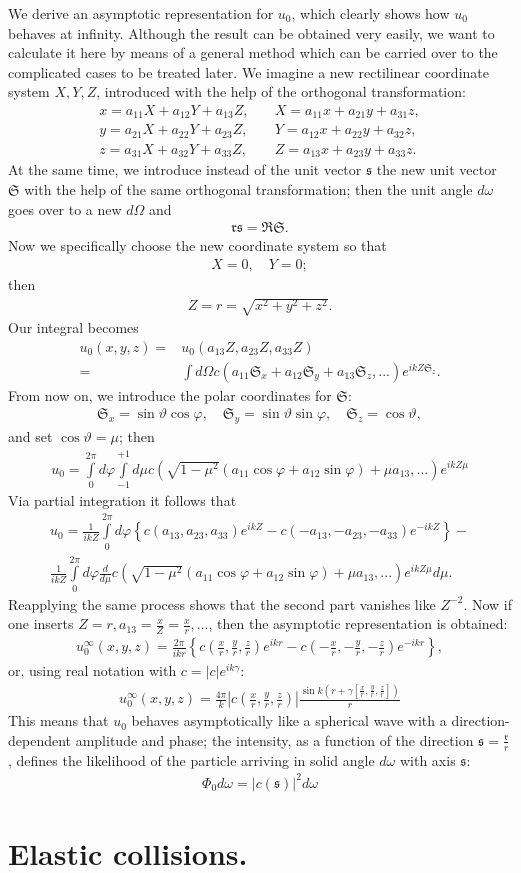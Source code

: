 \documentclass[a4paper,11pt]{article}
\newcommand{\?}[2]{#1\footnote{\textsc{Translator note}: #2}}
\newcommand{\nequ}[2]{\begin{align*}\tag{#1}#2\end{align*}}
\newcommand{\uequ}[1]{\begin{align*}#1\end{align*}}
\renewcommand{\exp}[1]{e^{#1}}
\newcommand{\dXdY}[2]{\frac{d{#1}}{{d{#2}}}}
\begin{document}
We derive an asymptotic representation for $u_0$, which clearly shows how $u_0$ behaves at infinity. Although the result can be obtained very easily, we want to calculate it here by means of a general method which can be carried over to the complicated cases to be treated later. We imagine a new rectilinear coordinate system $X, Y, Z$, introduced with the help of the orthogonal transformation:
\nequ{12}{
x = a_{11}X + a_{12}Y + a_{13}Z, \quad & X = a_{11} x + a_{21} y + a_{31}z,\\
y = a_{21}X + a_{22}Y + a_{23}Z, \quad & Y = a_{12} x + a_{22} y + a_{32}z,\\
z = a_{31}X + a_{32}Y + a_{33}Z, \quad & Z = a_{13} x + a_{23} y + a_{33}z.
}
At the same time, we introduce instead of the unit vector $\mathfrak{s}$ the new unit vector $\mathfrak{S}$ with the help of the same orthogonal transformation; then the unit angle $d\omega$ goes over to a new $d\Omega$ and
\nequ{13}{
\mathfrak{rs} = \mathfrak{RS}.
}
Now we specifically choose the new coordinate system so that
\nequ{14}{
X = 0,\quad Y = 0;
}
then
\nequ{15}{
Z = r = \sqrt{x^2 + y^2 + z^2}.
}
Our integral becomes
\uequ{
u_0(x,y,z) = & u_0(a_{13}Z, a_{23}Z, a_{33}Z)\\
           = & \int d\Omega c\left(a_{11}\mathfrak{S}_x + a_{12}\mathfrak{S}_y + a_{13}\mathfrak{S}_z, ... \right)\exp{ikZ\mathfrak{S}_z}.
}
From now on, we introduce the polar coordinates for $\mathfrak{S}$:
\nequ{16}{
\mathfrak{S}_x = \sin{\vartheta}\cos{\varphi},\quad
\mathfrak{S}_y = \sin{\vartheta}\sin{\varphi},\quad
\mathfrak{S}_z = \cos{\vartheta},
}
and set $\cos{\vartheta} = \mu$; then
\uequ{
u_0 = \int\limits_0^{2\pi}d\varphi\int\limits_{-1}^{+1}d\mu
c\left(\sqrt{1-\mu^2}
(a_{11}\cos{\varphi} + a_{12}\sin{\varphi}) + \mu a_{13}, ...
\right)\exp{ikZ\mu}
}
Via partial integration it follows that
\uequ{
u_0 = 
\frac{1}{ikZ}\int\limits_0^{2\pi}d\varphi\left\{
c(a_{13}, a_{23}, a_{33})\exp{ikZ} - 
c(-a_{13}, -a_{23}, -a_{33})\exp{-ikZ}\right\} - \\
\frac{1}{ikZ}\int\limits_0^{2\pi}d\varphi\dXdY{}{\mu}
c\left(\sqrt{1-\mu^2}(a_{11}\cos{\varphi} + a_{12}\sin{\varphi})
 + \mu a_{13}, ...\right)\exp{ikZ\mu} d\mu.
}
Reapplying the same process shows that the second part vanishes like $Z^{-2}$. Now if one inserts $Z=r, a_{13} = \frac{x}{Z} = \frac{x}{r}, \dots$, then the asymptotic representation is obtained:
\nequ{17}{
u_0^\infty(x,y,z) = \frac{2\pi}{ikr}\left\{
c\left(\frac{x}{r},\frac{y}{r},\frac{z}{r}\right)\exp{ikr} - 
c\left(-\frac{x}{r}, -\frac{y}{r}, -\frac{z}{r}\right)\exp{-ikr}
\right\},
}
or, using real notation with $c=|c|\exp{ik\gamma}$:
\nequ{18}{
u_0^\infty(x,y,z) = \frac{4\pi}{k}\left|
c\left(\frac{x}{r},\frac{y}{r},\frac{z}{r}\right)\right|
\frac{\sin{k}\left(r + \gamma\left[\frac{x}{r},\frac{y}{r},\frac{z}{r}\right]\right)
}{r}
}
This means that $u_0$ behaves asymptotically like a spherical wave with a direction-dependent amplitude and phase; the intensity, as a function of the direction $\mathfrak{s} = \frac{\mathfrak{r}}{r}$, defines the likelihood of the particle arriving in solid angle $d\omega$ with axis $\mathfrak{s}$:
\nequ{19}{
\Phi_0 d\omega = \left|c(\mathfrak{s})\right|^2 d\omega
}

\section{Elastic collisions.}
\end{document}
